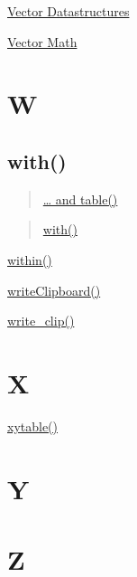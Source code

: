 \documentclass[]{book}
\begin{document}
\href{https://linkedin-learning.pxf.io/rwkly_vector}{Vector Datastructures}

\href{https://linkedin-learning.pxf.io/rweekly_vectormath}{Vector Math}

\hypertarget{w}{%
\chapter*{W}\label{w}}

\hypertarget{with}{%
\section{with()}\label{with}}

\begin{quote}
\href{https://linkedin-learning.pxf.io/rweekly_table}{\ldots{} and table()}
\end{quote}

\begin{quote}
\href{https://linkedin-learning.pxf.io/rweekly_with}{with()}
\end{quote}

\href{https://linkedin-learning.pxf.io/rweekly_with}{within()}

\href{https://linkedin-learning.pxf.io/rweekly_clipboard}{writeClipboard()}

\href{https://linkedin-learning.pxf.io/rweekly_clipboard}{write\_clip()}

\hypertarget{x}{%
\chapter*{X}\label{x}}

\href{https://linkedin-learning.pxf.io/rweekly_sunflower}{xytable()}

\hypertarget{y}{%
\chapter*{Y}\label{y}}

\hypertarget{z}{%
\chapter*{Z}\label{z}}
\end{document}
